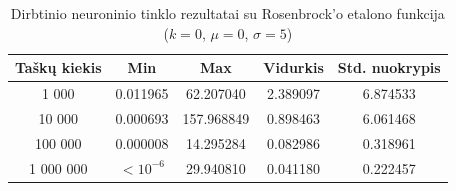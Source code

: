 \begin{table}[H]
    \centering
    \begin{tabular}{|c|c|c|c|c|}
        \hline
        \textbf{Taškų kiekis} & \textbf{Min} & \textbf{Max} & \textbf{Vidurkis} & \textbf{Std. nuokrypis} \\ \hline
        1 000        & 0.011965 & 62.207040 & 2.389097 & 6.874533 \\ \hline
        10 000       & 0.000693 & 157.968849 & 0.898463 & 6.061468 \\ \hline
        100 000      & 0.000008 & 14.295284 & 0.082986 & 0.318961 \\ \hline
        1 000 000    & $<10^{-6}$ & 29.940810 & 0.041180 & 0.222457 \\ \hline
    \end{tabular}
    \caption{Dirbtinio neuroninio tinklo rezultatai su Rosenbrock'o etalono funkcija ($k = 0$, $\mu = 0$, $\sigma = 5$)}
\end{table}